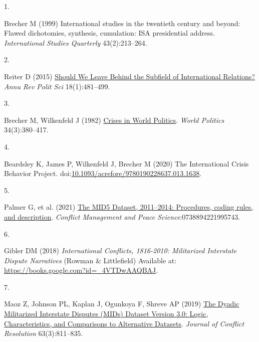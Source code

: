 \documentclass{article}
\newlength{\cslhangindent}
\newlength{\csllabelwidth}
\newlength{\cslentryspacingunit} %
\newenvironment{CSLReferences}[2] %
 {%
  \setlength{\parindent}{0pt}
  \ifodd #1
  \let\oldpar\par
  \def\par{\hangindent=\cslhangindent\oldpar}
  \fi
  \setlength{\parskip}{#2\cslentryspacingunit}
 }%
 {}
\newcommand{\CSLLeftMargin}[1]{\parbox[t]{\csllabelwidth}{#1}}
\newcommand{\CSLRightInline}[1]{\parbox[t]{\linewidth - \csllabelwidth}{#1}\break}
\begin{document}
\hypertarget{refs}{}
\begin{CSLReferences}{0}{0}
\leavevmode{}%
\CSLLeftMargin{1. }
\CSLRightInline{Brecher M (1999) International studies in the twentieth
century and beyond: {Flawed} dichotomies, synthesis, cumulation: {ISA}
presidential address. \emph{International Studies Quarterly}
43(2):213--264.}

\leavevmode{}%
\CSLLeftMargin{2. }
\CSLRightInline{Reiter D (2015)
\href{https://doi.org/10.1146/annurev-polisci-053013-041156}{Should {We
Leave Behind} the {Subfield} of {International Relations}?} \emph{Annu
Rev Polit Sci} 18(1):481--499.}

\leavevmode{}%
\CSLLeftMargin{3. }
\CSLRightInline{Brecher M, Wilkenfeld J (1982)
\href{https://doi.org/10.2307/2010324}{Crises in {World Politics}}.
\emph{World Politics} 34(3):380--417.}

\leavevmode{}%
\CSLLeftMargin{4. }
\CSLRightInline{Beardsley K, James P, Wilkenfeld J, Brecher M (2020) The
{International Crisis Behavior Project}.
doi:\href{https://doi.org/10.1093/acrefore/9780190228637.013.1638}{10.1093/acrefore/9780190228637.013.1638}.}

\leavevmode{}%
\CSLLeftMargin{5. }
\CSLRightInline{Palmer G, et al. (2021)
\href{https://doi.org/10.1177/0738894221995743}{The {MID5 Dataset},
2011--2014: {Procedures}, coding rules, and description}. \emph{Conflict
Management and Peace Science}:0738894221995743.}

\leavevmode{}%
\CSLLeftMargin{6. }
\CSLRightInline{Gibler DM (2018) \emph{International {Conflicts},
1816-2010: {Militarized Interstate Dispute Narratives}} ({Rowman \&
Littlefield}) Available at:
\url{https://books.google.com?id=_4VTDwAAQBAJ}.}

\leavevmode{}%
\CSLLeftMargin{7. }
\CSLRightInline{Maoz Z, Johnson PL, Kaplan J, Ogunkoya F, Shreve AP
(2019) \href{https://doi.org/10.1177/0022002718784158}{The {Dyadic
Militarized Interstate Disputes} ({MIDs}) {Dataset Version} 3.0:
{Logic}, {Characteristics}, and {Comparisons} to {Alternative
Datasets}}. \emph{Journal of Conflict Resolution} 63(3):811--835.}


\end{CSLReferences}
\end{document}

